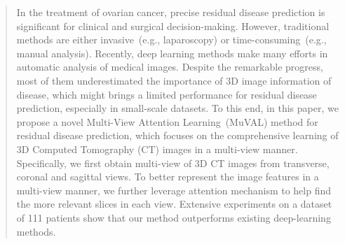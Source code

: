 \begin{abstract}
In the treatment of ovarian cancer, precise residual disease prediction is significant for clinical and surgical decision-making.
However, traditional methods are either invasive~(e.g., laparoscopy) or time-consuming~(e.g., manual analysis).
Recently, deep learning methods make many efforts in automatic analysis of medical images.
Despite the remarkable progress, most of them underestimated the importance of 3D image information of disease, which might brings a limited performance for residual disease prediction, especially in small-scale datasets.
To this end, in this paper,
we propose a novel Multi-View Attention Learning~(MuVAL) method for residual disease prediction,
which focuses on the comprehensive learning of 3D Computed Tomography (CT) images in a multi-view manner.
Specifically, we first obtain multi-view of 3D CT images from transverse, coronal and sagittal views.
To better represent the image features in a multi-view manner, we further leverage attention mechanism to help find the more relevant slices in each view. 
Extensive experiments on a dataset of 111 patients show that our method outperforms existing deep-learning methods. 

\end{abstract}